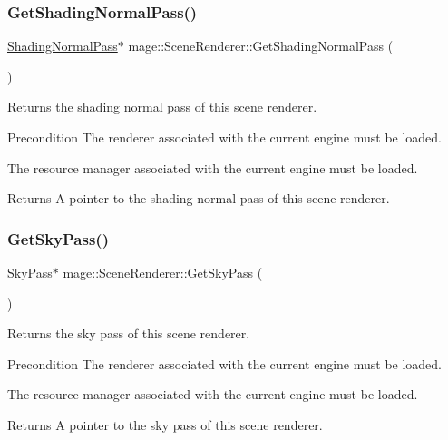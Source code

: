 \subsubsection{\texorpdfstring{Get\+Shading\+Normal\+Pass()}{GetShadingNormalPass()}}
{\footnotesize\ttfamily \hyperlink{classmage_1_1_shading_normal_pass}{Shading\+Normal\+Pass}$\ast$ mage\+::\+Scene\+Renderer\+::\+Get\+Shading\+Normal\+Pass (\begin{DoxyParamCaption}{ }\end{DoxyParamCaption})}

Returns the shading normal pass of this scene renderer.

\begin{DoxyPrecond}{Precondition}
The renderer associated with the current engine must be loaded. 

The resource manager associated with the current engine must be loaded. 
\end{DoxyPrecond}
\begin{DoxyReturn}{Returns}
A pointer to the shading normal pass of this scene renderer. 
\end{DoxyReturn}
\hypertarget{classmage_1_1_scene_renderer_a4084ba56458ae0678b0d970ceb87cbd0}{}\label{classmage_1_1_scene_renderer_a4084ba56458ae0678b0d970ceb87cbd0} 
\subsubsection{\texorpdfstring{Get\+Sky\+Pass()}{GetSkyPass()}}
{\footnotesize\ttfamily \hyperlink{classmage_1_1_sky_pass}{Sky\+Pass}$\ast$ mage\+::\+Scene\+Renderer\+::\+Get\+Sky\+Pass (\begin{DoxyParamCaption}{ }\end{DoxyParamCaption})}

Returns the sky pass of this scene renderer.

\begin{DoxyPrecond}{Precondition}
The renderer associated with the current engine must be loaded. 

The resource manager associated with the current engine must be loaded. 
\end{DoxyPrecond}
\begin{DoxyReturn}{Returns}
A pointer to the sky pass of this scene renderer. 
\end{DoxyReturn}
\hypertarget{classmage_1_1_scene_renderer_a5a7c407e308d6f449b8cbee08794d8bd}{}\label{classmage_1_1_scene_renderer_a5a7c407e308d6f449b8cbee08794d8bd} 
